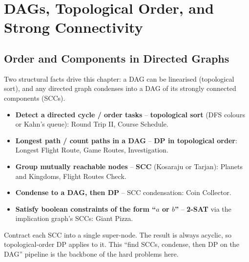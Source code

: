 \chapter{DAGs, Topological Order, and Strong Connectivity}

\section{Order and Components in Directed Graphs}
\label{sec:cses-graph-dag-intro}

Two structural facts drive this chapter: a DAG can be linearised
(topological sort), and any directed graph condenses into a DAG of its
strongly connected components (SCCs).

\begin{patternbox}
\begin{itemize}
  \item \textbf{Detect a directed cycle / order tasks} --
        \textbf{topological sort} (DFS colours or Kahn's queue): Round
        Trip II, Course Schedule.
  \item \textbf{Longest path / count paths in a DAG} -- \textbf{DP in
        topological order}: Longest Flight Route, Game Routes,
        Investigation.
  \item \textbf{Group mutually reachable nodes} -- \textbf{SCC} (Kosaraju
        or Tarjan): Planets and Kingdoms, Flight Routes Check.
  \item \textbf{Condense to a DAG, then DP} -- SCC condensation: Coin
        Collector.
  \item \textbf{Satisfy boolean constraints of the form ``$a$ or $b$''}
        -- \textbf{2-SAT} via the implication graph's SCCs: Giant Pizza.
  \end{itemize}
\end{patternbox}

\begin{ideabox}
Contract each SCC into a single super-node. The result is always acyclic,
so topological-order DP applies to it. This ``find SCCs, condense, then DP
on the DAG'' pipeline is the backbone of the hard problems here.
\end{ideabox}

\newpage










